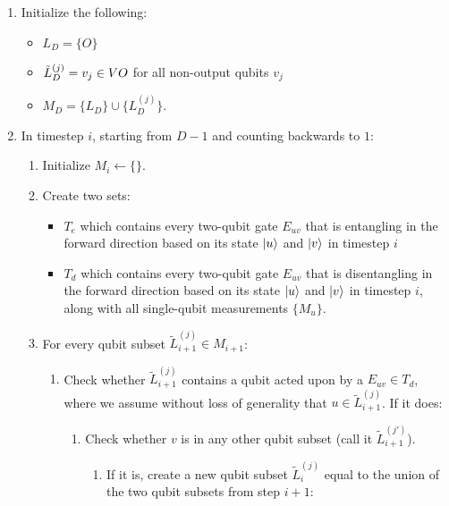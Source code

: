 \begin{enumerate}
\item
Initialize the following:
\begin{itemize}
\item
$L_D = \{ O \}$
\item
$\tilde{L}^{(j)}_D = v_j \in V \\ O$ for all non-output qubits $v_j$
\item
$M_D = \{ L_D \} \cup \{ L^{(j)}_D \}$.
\end{itemize}

\item
In timestep $i$, starting from $D-1$ and counting backwards to $1$:

\begin{enumerate}

\item
Initialize $M_i \leftarrow \{\}$.
\item
Create two sets:
\begin{itemize}
\item $T_e$ which contains every two-qubit
gate $E_{uv}$ that is entangling in the forward direction based on
its state $\left\vert{u}\right\rangle$ and $\left\vert{v}\right\rangle$ in timestep $i$
\item $T_d$ which contains every two-qubit
gate $E_{uv}$ that is disentangling in the forward direction
 based on
its state $\left\vert{u}\right\rangle$ and $\left\vert{v}\right\rangle$ in timestep $i$,
along with all single-qubit measurements $\{ M_u \}$.
\end{itemize}

\item
For every qubit subset $\tilde{L}^{(j)}_{i+1} \in M_{i+1}$:

\begin{enumerate}
\item Check whether $\tilde{L}^{(j)}_{i+1}$ contains a qubit acted upon by a
$E_{uv} \in T_d$, where we assume without loss of generality that
$u \in \tilde{L}^{(j)}_{i+1}$. If it does:

\begin{enumerate}
\item Check whether $v$ is in any other qubit subset
(call it $\tilde{L}^{(j')}_{i+1}$).

\begin{enumerate}
\item
If it is, create a new qubit subset
$\tilde{L}^{(j)}_{i}$ equal to the union of the two qubit subsets from
step $i+1$:


\end{enumerate}
\end{enumerate}
\end{enumerate}
\end{enumerate}
\end{enumerate}
